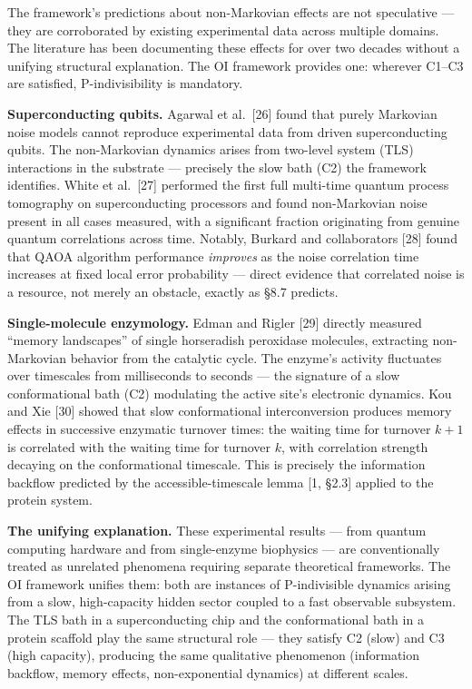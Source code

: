 \documentclass[
]{article}
\begin{document}
The framework's predictions about non-Markovian effects are not
speculative --- they are corroborated by existing experimental data
across multiple domains. The literature has been documenting these
effects for over two decades without a unifying structural explanation.
The OI framework provides one: wherever C1--C3 are satisfied,
P-indivisibility is mandatory.

\textbf{Superconducting qubits.} Agarwal et al.~{[}26{]} found that
purely Markovian noise models cannot reproduce experimental data from
driven superconducting qubits. The non-Markovian dynamics arises from
two-level system (TLS) interactions in the substrate --- precisely the
slow bath (C2) the framework identifies. White et al.~{[}27{]} performed
the first full multi-time quantum process tomography on superconducting
processors and found non-Markovian noise present in all cases measured,
with a significant fraction originating from genuine quantum
correlations across time. Notably, Burkard and collaborators {[}28{]}
found that QAOA algorithm performance \emph{improves} as the noise
correlation time increases at fixed local error probability --- direct
evidence that correlated noise is a resource, not merely an obstacle,
exactly as §8.7 predicts.

\textbf{Single-molecule enzymology.} Edman and Rigler {[}29{]} directly
measured ``memory landscapes'' of single horseradish peroxidase
molecules, extracting non-Markovian behavior from the catalytic cycle.
The enzyme's activity fluctuates over timescales from milliseconds to
seconds --- the signature of a slow conformational bath (C2) modulating
the active site's electronic dynamics. Kou and Xie {[}30{]} showed that
slow conformational interconversion produces memory effects in
successive enzymatic turnover times: the waiting time for turnover
\(k+1\) is correlated with the waiting time for turnover \(k\), with
correlation strength decaying on the conformational timescale. This is
precisely the information backflow predicted by the accessible-timescale
lemma {[}1, §2.3{]} applied to the protein system.

\textbf{The unifying explanation.} These experimental results --- from
quantum computing hardware and from single-enzyme biophysics --- are
conventionally treated as unrelated phenomena requiring separate
theoretical frameworks. The OI framework unifies them: both are
instances of P-indivisible dynamics arising from a slow, high-capacity
hidden sector coupled to a fast observable subsystem. The TLS bath in a
superconducting chip and the conformational bath in a protein scaffold
play the same structural role --- they satisfy C2 (slow) and C3 (high
capacity), producing the same qualitative phenomenon (information
backflow, memory effects, non-exponential dynamics) at different scales.
\end{document}
